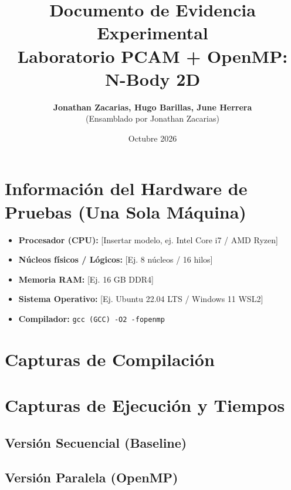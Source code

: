 \documentclass[11pt,a4paper]{article}
\title{
    \vspace{-1.5cm}
    \textbf{\Large Documento de Evidencia Experimental}\\[0.2cm]
    \textbf{\large Laboratorio PCAM + OpenMP: N-Body 2D}
}
\author{\textbf{Jonathan Zacarias, Hugo Barillas, June Herrera}\\ (Ensamblado por Jonathan Zacarias)}
\date{Octubre 2026}
\begin{document}
\maketitle

\section{Información del Hardware de Pruebas (Una Sola Máquina)}
\begin{itemize}
    \item \textbf{Procesador (CPU):} [Insertar modelo, ej. Intel Core i7 / AMD Ryzen]
    \item \textbf{Núcleos físicos / Lógicos:} [Ej. 8 núcleos / 16 hilos]
    \item \textbf{Memoria RAM:} [Ej. 16 GB DDR4]
    \item \textbf{Sistema Operativo:} [Ej. Ubuntu 22.04 LTS / Windows 11 WSL2]
    \item \textbf{Compilador:} \texttt{gcc (GCC) -O2 -fopenmp}
\end{itemize}

\section{Capturas de Compilación}

\section{Capturas de Ejecución y Tiempos}

\subsection{Versión Secuencial (Baseline)}

\subsection{Versión Paralela (OpenMP)}
\end{document}
